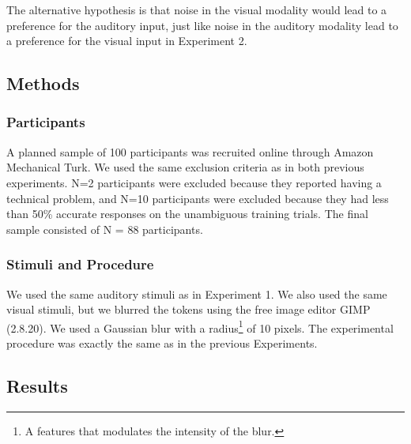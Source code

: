 \documentclass[english,,man,floatsintext]{apa6}
\let\rmarkdownfootnote\footnote%
\def\footnote{\protect\rmarkdownfootnote}
\theoremstyle{definition}
\theoremstyle{definition}
\theoremstyle{definition}
\theoremstyle{remark}
\begin{document}
The alternative hypothesis is that noise in the visual modality would
lead to a preference for the auditory input, just like noise in the
auditory modality lead to a preference for the visual input in
Experiment 2.

\subsection{Methods}\label{methods-2}

\subsubsection{Participants}\label{participants-2}

A planned sample of 100 participants was recruited online through Amazon
Mechanical Turk. We used the same exclusion criteria as in both previous
experiments. N=2 participants were excluded because they reported having
a technical problem, and N=10 participants were excluded because they
had less than 50\% accurate responses on the unambiguous training
trials. The final sample consisted of N = 88 participants.

\subsubsection{Stimuli and Procedure}\label{stimuli-and-procedure-1}

We used the same auditory stimuli as in Experiment 1. We also used the
same visual stimuli, but we blurred the tokens using the free image
editor GIMP (2.8.20). We used a Gaussian blur with a
radius\footnote{A features that modulates the intensity of the blur.} of
10 pixels. The experimental procedure was exactly the same as in the
previous Experiments.

\subsection{Results}\label{results-1}
\end{document}
